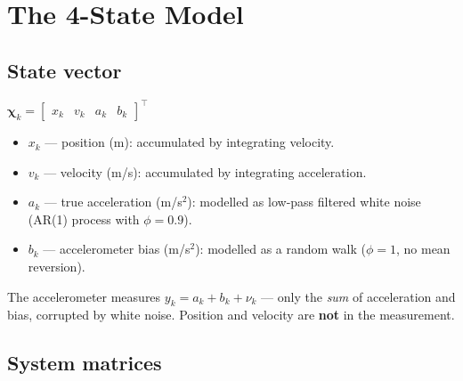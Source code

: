 \documentclass[12pt, a4paper]{article}
\begin{document}
\clearpage
\section*{The 4-State Model}

\subsection*{State vector}

\begin{defbox}
  $\boldsymbol{\chi}_k = \begin{bmatrix} x_k & v_k & a_k & b_k \end{bmatrix}^\top$
  \begin{itemize}[leftmargin=1.4em, topsep=4pt]
    \item $x_k$ --- position (m): accumulated by integrating velocity.
    \item $v_k$ --- velocity (m/s): accumulated by integrating acceleration.
    \item $a_k$ --- true acceleration (m/s$^2$): modelled as
          low-pass filtered white noise (AR(1) process with $\phi = 0.9$).
    \item $b_k$ --- accelerometer bias (m/s$^2$): modelled as a random
          walk ($\phi = 1$, no mean reversion).
  \end{itemize}
  The accelerometer measures $y_k = a_k + b_k + \nu_k$ --- only the
  \emph{sum} of acceleration and bias, corrupted by white noise.
  Position and velocity are \textbf{not} in the measurement.
\end{defbox}

\subsection*{System matrices}
\end{document}
